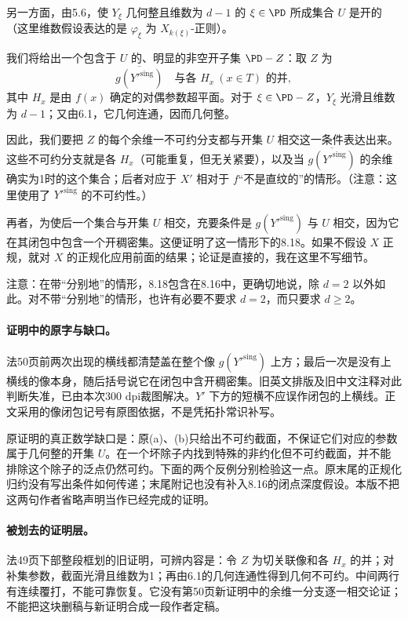 \documentclass[UTF8,a4paper]{ctexbook}
\begin{document}
另一方面，由5.6，使 $Y_\xi$ 几何整且维数为 $d-1$ 的 $\xi\in\PD$ 所成集合 $U$ 是开的（这里维数假设表达的是 $\varphi_\xi$ 为 $X_{k(\xi)}$-正则）。

我们将给出一个包含于 $U$ 的、明显的非空开子集 $\PD-Z$：取 $Z$ 为
\[
 \overline{g(Y'^{\mathrm{sing}})}
 \quad\text{与各 }H_x\ (x\in T)\text{ 的并},
\]
其中 $H_x$ 是由 $f(x)$ 确定的对偶参数超平面。对于 $\xi\in\PD-Z$，$Y_\xi$ 光滑且维数为 $d-1$；又由6.1，它几何连通，因而几何整。

因此，我们要把 $Z$ 的每个余维一不可约分支都与开集 $U$ 相交这一条件表达出来。这些不可约分支就是各 $H_x$（可能重复，但无关紧要），以及当 $\overline{g(Y'^{\mathrm{sing}})}$ 的余维确实为1时的这个集合；后者对应于 $X'$ 相对于 $f$“不是直纹的”的情形。（注意：这里使用了 $Y'^{\mathrm{sing}}$ 的不可约性。）

再者，为使后一个集合与开集 $U$ 相交，充要条件是 $g(Y'^{\mathrm{sing}})$ 与 $U$ 相交，因为它在其闭包中包含一个开稠密集。这便证明了这一情形下的8.18。如果不假设 $X$ 正规，就对 $X$ 的正规化应用前面的结果；论证是直接的，我在这里不写细节。

注意：在带“分别地”的情形，8.18包含在8.16中，更确切地说，除 $d=2$ 以外如此。对不带“分别地”的情形，也许有必要不要求 $d=2$，而只要求 $d\ge2$。

\paragraph{证明中的原字与缺口。}
法50页前两次出现的横线都清楚盖在整个像 $g(Y'^{\mathrm{sing}})$ 上方；最后一次是没有上横线的像本身，随后括号说它在闭包中含开稠密集。旧英文排版及旧中文注释对此判断失准，已由本次300 dpi裁图解决。$Y'$ 下方的短横不应误作闭包的上横线。正文采用的像闭包记号有原图依据，不是凭拓扑常识补写。

原证明的真正数学缺口是：原(a)、(b)只给出不可约截面，不保证它们对应的参数属于几何整的开集 $U$。在一个坏除子内找到特殊的非约化但不可约截面，并不能排除这个除子的泛点仍然可约。下面的两个反例分别检验这一点。原末尾的正规化归约没有写出条件如何传递；末尾附记也没有补入8.16的闭点深度假设。本版不把这两句作者省略声明当作已经完成的证明。

\paragraph{被划去的证明层。}
法49页下部整段框划的旧证明，可辨内容是：令 $Z$ 为切关联像和各 $H_x$ 的并；对补集参数，截面光滑且维数为1；再由6.1的几何连通性得到几何不可约。中间两行有连续覆打，不能可靠恢复。它没有第50页新证明中的余维一分支逐一相交论证；不能把这块删稿与新证明合成一段作者定稿。
\end{document}
